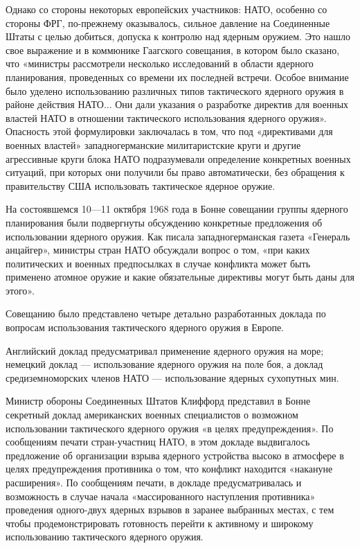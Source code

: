 \documentclass[12pt, a4paper, openany]{book}
\begin{document}
	Однако со стороны некоторых европейских участников: НАТО, особенно со стороны ФРГ, по-прежнему оказывалось, сильное давление на Соединенные Штаты с целью добиться, допуска к контролю над ядерным оружием. Это нашло свое выражение и в коммюнике Гаагского совещания, в котором было сказано, что «министры рассмотрели несколько исследований в области ядерного планирования, проведенных со времени их последней встречи. Особое внимание было уделено использованию различных типов тактического ядерного оружия в районе действия НАТО... Они дали указания о разработке директив для военных властей НАТО в отношении тактического использования ядерного оружия». Опасность этой формулировки заключалась в том, что под «директивами для военных властей» западногерманские милитаристские круги и другие агрессивные круги блока НАТО подразумевали определение конкретных военных ситуаций, при которых они получили бы право автоматически, без обращения к правительству США использовать тактическое ядерное оружие.
	
	На состоявшемся 10—11 октября 1968 года в Бонне совещании группы ядерного планирования были подвергнуты обсуждению конкретные предложения об использовании ядерного оружия. Как писала западногерманская газета «Генераль анцайгер», министры стран НАТО обсуждали вопрос о том, «при каких политических и военных предпосылках в случае конфликта может быть применено атомное оружие и какие обязательные директивы могут быть даны для этого».
	
	Совещанию было представлено четыре детально разработанных доклада по вопросам использования тактического ядерного оружия в Европе.
	
	Английский доклад предусматривал применение ядерного оружия на море; немецкий доклад — использование ядерного оружия на поле боя, а доклад средиземноморских членов НАТО — использование ядерных сухопутных мин.
	
	Министр обороны Соединенных Штатов Клиффорд представил в Бонне секретный доклад американских военных специалистов о возможном использовании тактического ядерного оружия «в целях предупреждения». По сообщениям печати стран-участниц НАТО, в этом докладе выдвигалось предложение об организации взрыва ядерного устройства высоко в атмосфере в целях предупреждения противника о том, что конфликт находится «накануне расширения». По сообщениям печати, в докладе предусматривалась и возможность в случае начала «массированного наступления противника» проведения одного-двух ядерных взрывов в заранее выбранных местах, с тем чтобы продемонстрировать готовность перейти к активному и широкому использованию тактического ядерного оружия.
	
\end{document}

